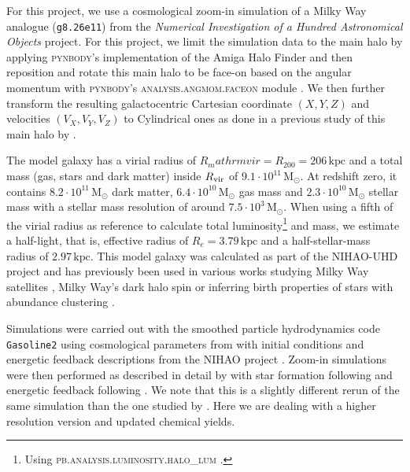 \documentclass[fleqn,usenatbib]{mnras}
\begin{document}
For this project, we use a cosmological zoom-in simulation of a Milky Way analogue (\texttt{g8.26e11}) from the \textit{Numerical Investigation of a Hundred Astronomical Objects} \citep[NIHAO,][]{Wang2015} project. For this project, we limit the simulation data to the main halo by applying \textsc{pynbody}'s implementation of the Amiga Halo Finder \citep{Knollman2009} and then reposition and rotate this main halo to be face-on based on the angular momentum with \textsc{pynbody}'s \textsc{analysis.angmom.faceon} module \citep{pynbody}. We then further transform the resulting galactocentric Cartesian coordinate $(X,Y,Z)$ and velocities $(V_X,V_Y,V_Z)$ to Cylindrical ones as done in a previous study of this main halo by \citet{Buder2024}.

The model galaxy has a virial radius of $R_mathrm{vir} = R_{200}=206\,\mathrm{kpc}$ and a total mass (gas, stars and dark matter) inside $R_{\rm vir}$ of $9.1 \cdot 10^{11}\,\mathrm{M_\odot}$. At redshift zero, it contains $8.2 \cdot 10^{11}\,\mathrm{M_\odot}$ dark matter, $6.4 \cdot 10^{10}\,\mathrm{M_\odot}$ gas mass and $2.3 \cdot 10^{10}\,\mathrm{M_\odot}$ stellar mass with a stellar mass resolution of around $7.5 \cdot 10^{3}\,\mathrm{M_\odot}$. When using a fifth of the virial radius as reference to calculate total luminosity\footnote{Using \textsc{pb.analysis.luminosity.halo\_lum} \citep{pynbody}.} and mass, we estimate a half-light, that is, effective radius of $R_e = 3.79\,\mathrm{kpc}$ and a half-stellar-mass radius of $\mathrm{2.97\,\mathrm{kpc}}$. This model galaxy was calculated as part of the NIHAO-UHD project \citep{Buck2020b} and has previously been used in various works studying Milky Way satellites \citep{Buck2019b}, Milky Way's dark halo spin \citep{Obreja2022} or inferring birth properties of stars with abundance clustering \citep{Ratcliffe2022}.

Simulations were carried out with the smoothed particle hydrodynamics code \texttt{Gasoline2} \citep{Wadsley2017} using cosmological parameters from \citet{Planck2014} with initial conditions and energetic feedback descriptions from the NIHAO project \citep{Wang2015}. Zoom-in simulations were then performed as described in detail by \citet{Buck2021} with star formation following \citet{Stinson2006} and energetic feedback following \citet{Stinson2013}. We note that this is a slightly different rerun of the same simulation than the one studied by \citet{Buder2024}. Here we are dealing with a higher resolution version and updated chemical yields.
\end{document}
